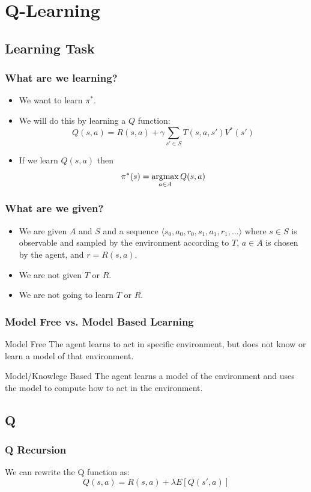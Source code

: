 \documentclass[ignorenonframetext]{beamer}
\newcommand{\argmax}{\operatornamewithlimits{argmax}}
\begin{document}
\section{Q-Learning}
\subsection{Learning Task}
\begin{frame}
	\frametitle{What are we learning?}
	\begin{itemize}
		\item We want to learn $\pi^*$.
			\pause
		\item We will do this by learning a $Q$ function:
			\[
			Q(s,a) = R(s,a) + \gamma \sum_{s' \in S}T(s,a, s') V^*(s')
			\]
			\pause
		\item If we learn $Q(s,a)$ then 
			\[
			\pi^*(s) = \argmax_{a\in A} Q(s,a)
			\]
	\end{itemize}
\end{frame}

\begin{frame}
	\frametitle{What are we given?}
	\begin{itemize}
		\item We are given $A$ and $S$ and a sequence 
			$\langle s_0,a_0,r_0,s_1,a_1,r_1,\dots \rangle$
			where $s \in S$ is observable and sampled by the environment
			according to $T$, $a\in A$ is chosen by the agent, and $r =
			R(s,a)$.
			\pause
		\item We are not given $T$ or $R$.
			\pause
		\item We are not going to learn $T$ or $R$.
	\end{itemize}
\end{frame}

\begin{frame}
	\frametitle{Model Free vs. Model Based Learning}
	\begin{block}{Model Free}
		The agent learns to act in specific environment, but does not
		know or learn a model of that environment.
	\end{block}
	\begin{block}{Model/Knowlege Based}
		The agent learns a model of the environment and uses the model to
		compute how to act in the environment.
	\end{block}
\end{frame}

\subsection{Q}
\begin{frame}
	\frametitle{Q Recursion}
	We can rewrite the Q function as:
	\[
	Q(s,a) = R(s,a) + \lambda E[Q(s',a)]
	\]
\end{frame}
\end{document}
